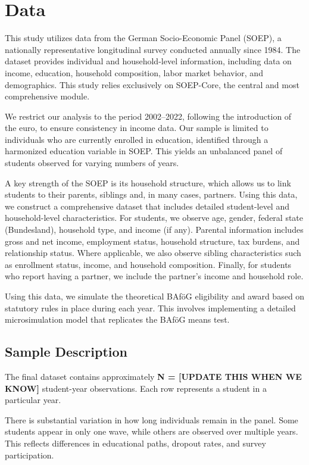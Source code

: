 \section{Data}
This study utilizes data from the German Socio-Economic Panel (SOEP), a nationally representative longitudinal survey conducted annually since 1984. The dataset provides individual and household-level information, including data on income, education, household composition, labor market behavior, and demographics. This study relies exclusively on SOEP-Core, the central and most comprehensive module.

We restrict our analysis to the period 2002–2022, following the introduction of the euro, to ensure consistency in income data. Our sample is limited to individuals who are currently enrolled in education, identified through a harmonized education variable in SOEP. This yields an unbalanced panel of students observed for varying numbers of years.

A key strength of the SOEP is its household structure, which allows us to link students to their parents, siblings and, in many cases, partners.
Using this data, we construct a comprehensive dataset that includes detailed student-level and household-level characteristics. For students, we observe age, gender, federal state (Bundesland), household type, and income (if any). Parental information includes gross and net income, employment status, household structure, tax burdens, and relationship status. Where applicable, we also observe sibling characteristics such as enrollment status, income, and household composition. Finally, for students who report having a partner, we include the partner’s income and household role.

Using this data, we simulate the theoretical BAföG eligibility and award based on statutory rules in place during each year. This involves implementing a detailed microsimulation model that replicates the BAföG means test.

\subsection{Sample Description}
The final dataset contains approximately \textbf{N = [UPDATE THIS WHEN WE KNOW]} student-year observations. Each row represents a student in a particular year.

There is substantial variation in how long individuals remain in the panel. Some students appear in only one wave, while others are observed over multiple years. This reflects differences in educational paths, dropout rates, and survey participation.

